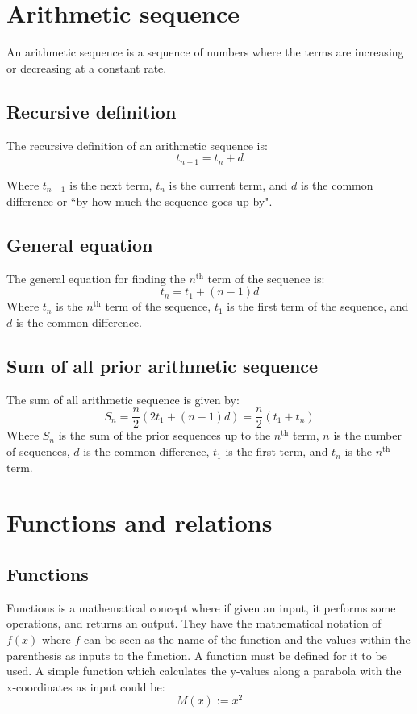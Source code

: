 \documentclass{book}
\begin{document}
\chapter{Arithmetic sequence}

An arithmetic sequence is a sequence of numbers where the terms are increasing or decreasing at a constant rate.

\section{Recursive definition}
The recursive definition of an arithmetic sequence is:
\[
	t_{n + 1} = t_n + d
\]

Where $t_{n + 1}$ is the next term, $t_n$ is the current term, and $d$ is the common difference or ``by how much the sequence goes up by".

\section{General equation}
The general equation for finding the $n^{\text{th}}$ term of the sequence is:
\[
	t_n = t_1 + (n - 1)d
\]
Where $t_n$ is the $n^{\text{th}}$ term of the sequence, $t_1$ is the first term of the sequence, and $d$ is the common difference.

\section{Sum of all prior arithmetic sequence}
The sum of all arithmetic sequence is given by:
\[
	S_n = \frac{n}{2}(2t_1 + (n - 1)d) = \frac{n}{2}(t_1 + t_n)
\]
Where $S_n$ is the sum of the prior sequences up to the $n^{\text{th}}$ term, $n$ is the number of sequences, $d$ is the common difference, $t_1$ is the first term, and $t_n$ is the $n^{\text{th}}$ term.

\chapter{Functions and relations}
\section{Functions}
Functions is a mathematical concept where if given an input, it performs some operations, and returns an output.  They have the mathematical notation of $f(x)$ where $f$ can be seen as the name of the function and the values within the parenthesis as inputs to the function.  A function must be defined for it to be used.  A simple function which calculates the y-values along a parabola with the x-coordinates as input could be:
\[
	M(x) := x^2
\]
\end{document}
